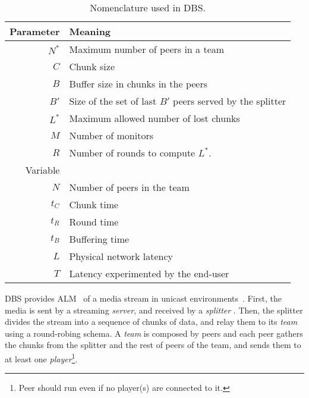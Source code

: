 

\label{sec:DBS}

\begin{table}
  \centering
  \begin{tabular}{rl}
    Parameter & Meaning \\
    \hline
    $N^*$  & Maximum number of peers in a team \\
    $C$    & Chunk size \\
    $B$    & Buffer size in chunks in the peers \\
    $B'$   & Size of the set of last $B'$ peers served by the splitter \\ 
    $L^*$  & Maximum allowed number of lost chunks \\
    $M$    & Number of monitors \\
    $R$    & Number of rounds to compute $L^*$. \\
    Variable & \\
    \hline
    $N$    & Number of peers in the team \\
    $t_C$  & Chunk time \\
    $t_R$  & Round time \\
    $t_B$  & Buffering time \\
    $L$    & Physical network latency \\
    $T$    & Latency experimented by the end-user
  \end{tabular}
  \caption{Nomenclature used in DBS.} %
  \label{tab:DBS_nomenclature}
\end{table}

\acrshort{DBS} provides ALM~\cite{banerjee2002scalable} of a media
stream in unicast environments~\cite{comer2003computer}. First, the
media is sent by a streaming \emph{server}, and received by a
\emph{splitter} . Then, the splitter
divides the stream into a sequence of chunks of data, and relay them
to its \emph{team} using a round-robing schema. A \emph{team} is
composed by peers and each peer gathers the chunks from the splitter
and the rest of peers of the team, and sends them to at least one
\emph{player}\footnote{Peer should run even if no player(s) are
  connected to it.}.

\begin{comment}
In single layered streams\footnote{Each layer of a
  scalable stream is received by a different peer attached to the same
  player capable or render scalable media.}, each peer is spawned by a
player (normal users should not run peers directly).
\end{comment}

\begin{comment}
/* quitar: We define the set of teams as
$\{T\}$,
and enumerate the peers in the team $T$ as $T=\{P_1,\cdots,P_{|T|}\}$. */
\end{comment}
